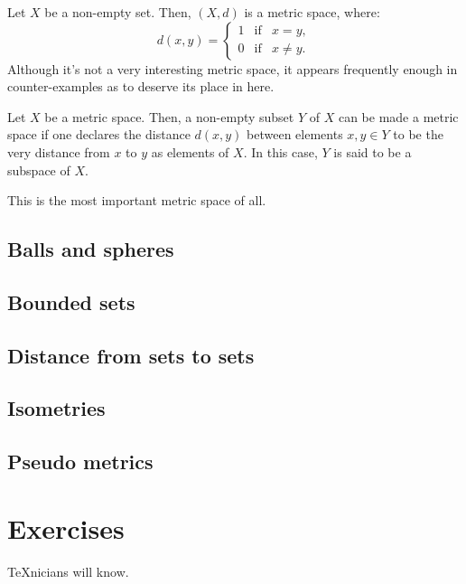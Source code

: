 \begin{example}\label{example:the-0-1-metric}
  Let \(X\) be a non-empty set. Then, \((X,d)\) is a metric space, where:
  \begin{equation*}
    d(x,y)=
    \left\{
      \begin{array}{lll}
        1 & \text{if} & x=y, \\
        0 & \text{if} & x\neq{y}.
      \end{array}
    \right.
  \end{equation*}
  Although it's not a very interesting metric space, it appears frequently
  enough in counter-examples as to deserve its place in here.
\end{example}

\begin{example}[Subspaces]\label{example:subspaces}
  Let \(X\) be a metric space. Then, a non-empty subset \(Y\) of \(X\) can be
  made a metric space if one declares the distance \(d(x,y)\) between elements
  \(x,y\in{Y}\) to be the very distance from \(x\) to \(y\) as elements of
  \(X\). In this case, \(Y\) is said to be a subspace of \(X\).
\end{example}

\begin{example}\label{example:the-real-line}
  This is the most important metric space of all.
\end{example}


\subsection{Balls and spheres}

\subsection{Bounded sets}

\subsection{Distance from sets to sets}

\subsection{Isometries}

\subsection{Pseudo metrics}

\section{Exercises}

\begin{exercise}
  \TeX{}nicians will know.
\end{exercise}
